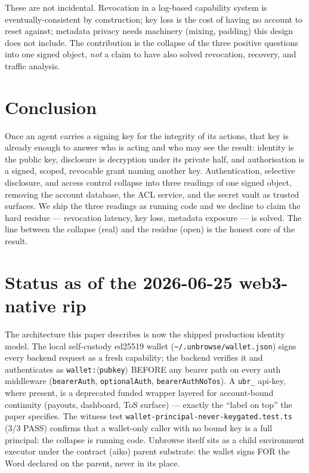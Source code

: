 \documentclass[11pt]{article}
\begin{document}
These are not incidental. Revocation in a log-based capability system is
eventually-consistent by construction; key loss is the cost of having no account to
reset against; metadata privacy needs machinery (mixing, padding) this design does
not include. The contribution is the collapse of the three positive questions into
one signed object, \emph{not} a claim to have also solved revocation, recovery, and
traffic analysis.

\section{Conclusion}
Once an agent carries a signing key for the integrity of its actions, that key is
already enough to answer who is acting and who may see the result: identity is the
public key, disclosure is decryption under its private half, and authorisation is a
signed, scoped, revocable grant naming another key. Authentication, selective
disclosure, and access control collapse into three readings of one signed object,
removing the account database, the ACL service, and the secret vault as trusted
surfaces. We ship the three readings as running code and we decline to claim the
hard residue --- revocation latency, key loss, metadata exposure --- is solved. The
line between the collapse (real) and the residue (open) is the honest core of the
result.

\section*{Status as of the 2026-06-25 web3-native rip}
The architecture this paper describes is now the shipped production identity model.
The local self-custody ed25519 wallet (\texttt{\textasciitilde/.unbrowse/wallet.json})
signs every backend request as a fresh capability; the backend verifies it and
authenticates as \texttt{wallet:$\langle$pubkey$\rangle$} BEFORE any bearer path on
every auth middleware (\texttt{bearerAuth}, \texttt{optionalAuth},
\texttt{bearerAuthNoTos}). A \texttt{ubr\_} api-key, where present, is a deprecated
funded wrapper layered for account-bound continuity (payouts, dashboard, ToS
surface) --- exactly the ``label on top'' the paper specifies. The
witness test \texttt{wallet-principal-never-keygated.test.ts} (3/3 PASS) confirms
that a wallet-only caller with no bound key is a full principal: the collapse is
running code. Unbrowse itself sits as a child environment executor under the
contract (aiko) parent substrate: the wallet signs FOR the Word declared on the
parent, never in its place.
\end{document}
